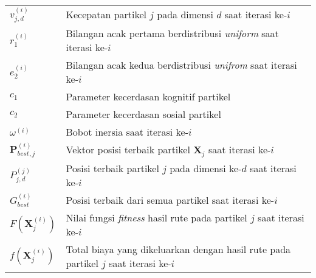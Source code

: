 \begin{tabular}{lp{}}
    $v_{j,d}^{(i)}$                 & Kecepatan partikel $j$ pada dimensi $d$ saat iterasi ke-$i$                          \\
    $r_{1}^{(i)}$                   & Bilangan acak pertama berdistribusi \textit{uniform} saat iterasi ke-$i$             \\
    $e_{2}^{(i)}$                   & Bilangan acak kedua berdistribusi \textit{unifrom} saat iterasi ke-$i$               \\
    $c_{1}$                         & Parameter kecerdasan kognitif partikel                                               \\
    $c_{2}$                         & Parameter kecerdasan sosial partikel                                                 \\
    $\omega^{(i)}$                  & Bobot inersia saat iterasi ke-$i$                                                    \\
    $\boldsymbol{P}_{best,j}^{(i)}$ & Vektor posisi terbaik partikel $\boldsymbol{X}_{j}$ saat iterasi ke-$i$              \\
    $P_{j,d}^{(j)}$                 & Posisi terbaik partikel $j$ pada dimensi ke-$d$ saat iterasi ke-$i$                  \\
    $G_{best}^{(i)}$                & Posisi terbaik dari semua partikel saat iterasi ke-$i$                               \\
    $F(\boldsymbol{X}_{j}^{(i)})$   & Nilai fungsi \textit{fitness} hasil rute pada partikel $j$ saat iterasi ke-$i$       \\
    $f(\boldsymbol{X}_{j}^{(i)})$   & Total biaya yang dikeluarkan dengan hasil rute pada partikel $j$ saat iterasi ke-$i$ \\
\end{tabular}




